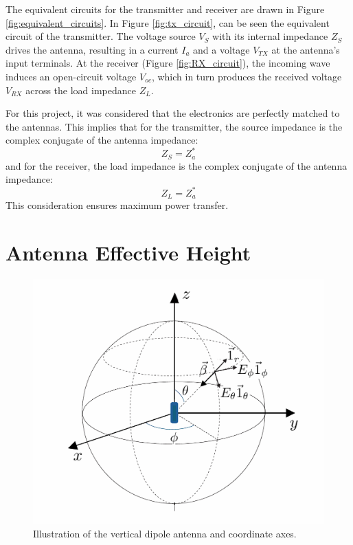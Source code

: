 The equivalent circuits for the transmitter and receiver are drawn in Figure \ref{fig:equivalent_circuits}. In Figure \ref{fig:tx_circuit}, can be seen the equivalent circuit of the transmitter. The voltage source $V_S$ with its internal impedance $Z_S$ drives the antenna, resulting in a current $I_a$ and a voltage $V_{TX}$ at the antenna's input terminals. At the receiver (Figure \ref{fig:RX_circuit}), the incoming wave induces an open-circuit voltage $V_{oc}$, which in turn produces the received voltage $V_{RX}$ across the load impedance $Z_L$.

For this project, it was considered that the electronics are perfectly matched to the antennas. This implies that for the transmitter, the source impedance is the complex conjugate of the antenna impedance:
\begin{equation}
	Z_S = Z_a^*
\end{equation}
\vspace{0.5em}
and for the receiver, the load impedance is the complex conjugate of the antenna impedance:
\begin{equation}
	Z_L = Z_a^*
\end{equation}
\vspace{0.5em}
This consideration ensures maximum power transfer.

\section{Antenna Effective Height}
\begin{figure}[H]
	\centering
	\includegraphics[width=0.5\linewidth]{content/4-images/axes.png}
	\caption{Illustration of the vertical dipole antenna and coordinate axes.}
	\label{fig:axes}
\end{figure}

